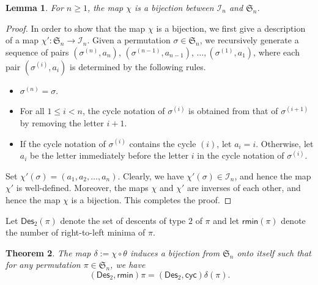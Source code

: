 \documentclass[12pt]{article}
\numberwithin{equation}{section}
\theoremstyle{plain}
\newtheorem{theorem}{Theorem}[section]
\newtheorem{lemma}[theorem]{Lemma}
\def\cyc{\mathsf{cyc}}
\def\Des{\mathsf{Des}}
\def\rmin{\mathsf{rmin}}
\begin{document}
     \begin{lemma}\label{lem-chi}
     	For $n\geq 1$, the map $\chi$ is a bijection between $\mathcal{I}_n$ and $\mathfrak{S}_n$.
     	\end{lemma}
     	\begin{proof}
     In order to show that the map $\chi$ is a bijection, we first give a description of a map $\chi'\colon \mathfrak{S}_n\rightarrow \mathcal{I}_n$. Given a permutation
     $\sigma\in \mathfrak{S}_n$, we recursively generate a sequence of pairs $(\sigma^{(n)}, a_n)$, $(\sigma^{(n-1)}, a_{n-1})$, $\ldots, (\sigma^{(1)}, a_1)$,  where each pair
     $(\sigma^{(i)}, a_i)$ is determined by the following rules.
     \begin{itemize}
     	\item $\sigma^{(n)}=\sigma$. 
     	\item For all $1\leq i<n$, the cycle notation of $\sigma^{(i)}$ is obtained from that of $\sigma^{(i+1)}$ by removing the letter $i+1$.
     	\item If the cycle notation of $\sigma^{(i)}$ contains the cycle $(i)$, let $a_i=i$. Otherwise,
     	let $a_i$ be the letter immediately before the letter $i$ in the cycle notation of $\sigma^{(i)}$.
     \end{itemize}
     Set $\chi'(\sigma)=(a_1, a_2, \ldots, a_n)$. Clearly, we have $\chi'(\sigma)\in \mathcal{I}_n$, and hence the map $\chi'$ is well-defined. Moreover, the maps $\chi$ and $\chi'$ are inverses of each other, and hence  the map $\chi$ is a bijection. This completes the proof.
     \end{proof}
     Let $\Des_2(\pi)$ denote the set of descents of type  $2$ of $\pi$ and let $\rmin(\pi)$ denote the number of right-to-left minima of $\pi$.  
     \begin{theorem}\label{thm-Des_2}
     The map $\delta:=\chi\circ\theta$ induces a bijection from $\mathfrak{S}_n$ onto itself such that for any permutation $\pi\in \mathfrak{S}_n$, we have
     	\begin{equation}\label{eq-Des_2}
     	(\Des_2, \rmin)\pi= (\Des_2, \cyc)\delta(\pi).
     		\end{equation}
     	\end{theorem}
\end{document}
